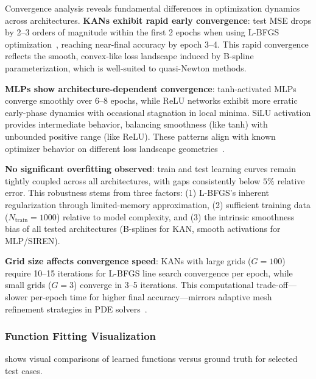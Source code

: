 \documentclass[11pt,a4paper]{article}
\begin{document}
Convergence analysis reveals fundamental differences in optimization dynamics across architectures. \textbf{KANs exhibit rapid early convergence}: test MSE drops by 2--3 orders of magnitude within the first 2 epochs when using L-BFGS optimization~\citep{liu1989limited}, reaching near-final accuracy by epoch 3--4. This rapid convergence reflects the smooth, convex-like loss landscape induced by B-spline parameterization, which is well-suited to quasi-Newton methods.

\textbf{MLPs show architecture-dependent convergence}: tanh-activated MLPs converge smoothly over 6--8 epochs, while ReLU networks exhibit more erratic early-phase dynamics with occasional stagnation in local minima. SiLU activation provides intermediate behavior, balancing smoothness (like tanh) with unbounded positive range (like ReLU). These patterns align with known optimizer behavior on different loss landscape geometries~\citep{kingma2015adam}.

\textbf{No significant overfitting observed}: train and test learning curves remain tightly coupled across all architectures, with gaps consistently below $5\%$ relative error. This robustness stems from three factors: (1) L-BFGS's inherent regularization through limited-memory approximation, (2) sufficient training data ($N_{\text{train}} = 1000$) relative to model complexity, and (3) the intrinsic smoothness bias of all tested architectures (B-splines for KAN, smooth activations for MLP/SIREN).

\textbf{Grid size affects convergence speed}: KANs with large grids ($G = 100$) require 10--15 iterations for L-BFGS line search convergence per epoch, while small grids ($G = 3$) converge in 3--5 iterations. This computational trade-off—slower per-epoch time for higher final accuracy—mirrors adaptive mesh refinement strategies in PDE solvers~\citep{huang2011adaptive}.

\subsubsection{Function Fitting Visualization}

 shows visual comparisons of learned functions versus ground truth for selected test cases.
\end{document}

